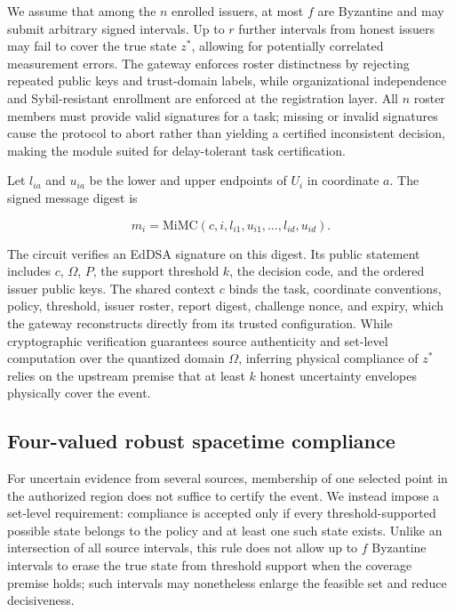 \documentclass[pdflatex,iicol,sn-mathphys-num]{sn-jnl}
\theoremstyle{thmstyleone}
\begin{document}
We assume that among the $n$ enrolled issuers, at most $f$ are Byzantine and may submit arbitrary signed intervals. Up to $r$ further intervals from honest issuers may fail to cover the true state $z^*$, allowing for potentially correlated measurement errors. The gateway enforces roster distinctness by rejecting repeated public keys and trust-domain labels, while organizational independence and Sybil-resistant enrollment are enforced at the registration layer. All $n$ roster members must provide valid signatures for a task; missing or invalid signatures cause the protocol to abort rather than yielding a certified inconsistent decision, making the module suited for delay-tolerant task certification.

Let $l_{ia}$ and $u_{ia}$ be the lower and upper endpoints of $U_i$ in coordinate $a$. The signed message digest is

\begin{equation}\label{eq:signedbox}
m_i = \mathrm{MiMC}(c, i, l_{i1}, u_{i1}, \dots, l_{id}, u_{id}).
\end{equation}


The circuit verifies an EdDSA signature on this digest. Its public statement includes $c$, $\Omega$, $P$, the support threshold $k$, the decision code, and the ordered issuer public keys. The shared context $c$ binds the task, coordinate conventions, policy, threshold, issuer roster, report digest, challenge nonce, and expiry, which the gateway reconstructs directly from its trusted configuration. While cryptographic verification guarantees source authenticity and set-level computation over the quantized domain $\Omega$, inferring physical compliance of $z^*$ relies on the upstream premise that at least $k$ honest uncertainty envelopes physically cover the event.

\subsection{Four-valued robust spacetime compliance}
For uncertain evidence from several sources, membership of one selected point in the authorized region does not suffice to certify the event. We instead impose a set-level requirement: compliance is accepted only if every threshold-supported possible state belongs to the policy and at least one such state exists. Unlike an intersection of all source intervals, this rule does not allow up to $f$ Byzantine intervals to erase the true state from threshold support when the coverage premise holds; such intervals may nonetheless enlarge the feasible set and reduce decisiveness.
\end{document}
